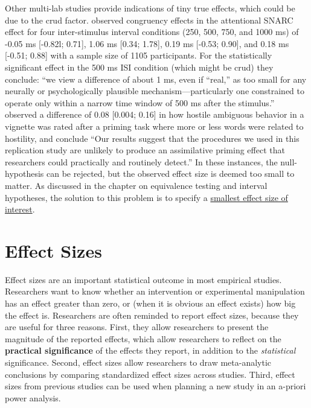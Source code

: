 \documentclass[
  oneside]{book}
\begin{document}
Other multi-lab studies provide indications of tiny true effects, which could be due to the crud factor. \citet{colling_registered_2020} observed congruency effects in the attentional SNARC effect for four inter-stimulus interval conditions (250, 500, 750, and 1000 ms) of -0.05 ms {[}-0.82l; 0.71{]}, 1.06 ms {[}0.34; 1.78{]}, 0.19 ms {[}-0.53; 0.90{]}, and 0.18 ms {[}-0.51; 0.88{]} with a sample size of 1105 participants. For the statistically significant effect in the 500 ms ISI condition (which might be crud) they conclude: ``we view a difference of about 1 ms, even if ``real,'' as too small for any neurally or psychologically plausible mechanism---particularly one constrained to operate only within a narrow time window of 500 ms after the stimulus.'' \citet{mccarthy_registered_2018} observed a difference of 0.08 {[}0.004; 0.16{]} in how hostile ambiguous behavior in a vignette was rated after a priming task where more or less words were related to hostility, and conclude ``Our results suggest that the procedures we used in this replication study are unlikely to produce an assimilative priming effect that researchers could practically and routinely detect.'' In these instances, the null-hypothesis can be rejected, but the observed effect size is deemed too small to matter. As discussed in the chapter on equivalence testing and interval hypotheses, the solution to this problem is to specify a \protect\hyperlink{sesoi}{smallest effect size of interest}.

\hypertarget{effectsize}{%
\chapter{Effect Sizes}\label{effectsize}}

Effect sizes are an important statistical outcome in most empirical studies. Researchers want to know whether an intervention or experimental manipulation has an effect greater than zero, or (when it is obvious an effect exists) how big the effect is. Researchers are often reminded to report effect sizes, because they are useful for three reasons. First, they allow researchers to present the magnitude of the reported effects, which allow researchers to reflect on the \textbf{practical significance} of the effects they report, in addition to the \emph{statistical} significance. Second, effect sizes allow researchers to draw meta-analytic conclusions by comparing standardized effect sizes across studies. Third, effect sizes from previous studies can be used when planning a new study in an a-priori power analysis.
\end{document}
